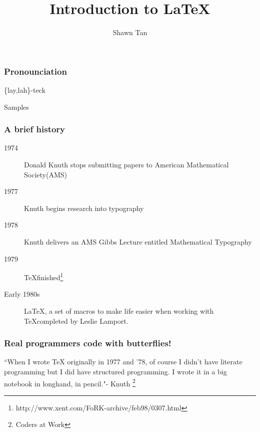 \usepackage{color}
\usepackage{animate}
\usepackage{verbatim}

\title{Introduction to \LaTeX}
\author{Shawn Tan}

\maketitle
\begin{frame}
	\frametitle{Pronounciation}
	\begin{center}	 
	\huge \{lay,lah\}-teck
	\end{center}
\end{frame}
\begin{frame}
	\begin{center}
		\huge Samples
	\end{center}
\end{frame}
\begin{frame}
	\frametitle{A brief history}
	\begin{description}
		\item[1974] Donald Knuth stops submitting papers to American Mathematical Society(AMS)
		\item[1977] Knuth begins research into typography
		\item[1978] Knuth delivers an AMS Gibbs Lecture entitled Mathematical Typography
		\item[1979] \TeX finished\footnote{http://www.xent.com/FoRK-archive/feb98/0307.html}
		\item[Early 1980s] \LaTeX, a set of macros to make life easier when working with \TeX completed by Leslie Lamport. 
	\end{description}
\end{frame}
\begin{frame}
	\frametitle{Real programmers code with butterflies!}
	``When I wrote TeX originally in 1977 and ’78, of course I didn’t have literate programming but I did have structured programming. I wrote it in a big notebook in longhand, in pencil."- Knuth \footnote{Coders at Work}
\end{frame}
